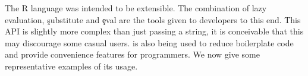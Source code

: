 \documentclass[screen,acmsmall]{acmart}
\newcommand{\mypara}[1]{\medskip\noindent\emph{#1}\xspace}
\newcommand{\authorcomment}[3]{\xspace\textcolor{#1}{{\bf #2} #3}\xspace}
\newcommand{\todo}[1]{\authorcomment{red}{TODO}{#1}}
\begin{document}













The R language was intended to be extensible. The combination of lazy
evaluation, \c{substitute} and \c{eval} are the tools given to
developers to this end. This API is slightly more complex than just
passing a string, it is conceivable that this may discourage some
casual users. \Eval is also being used to reduce boilerplate code and
provide convenience features for programmers. We now give some
representative examples of its usage.
\end{document}
